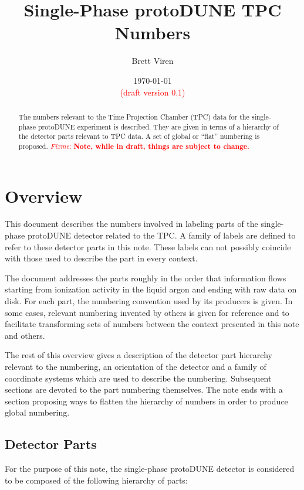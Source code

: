 \documentclass[pdftex,12pt,letter]{article}
\author{Brett Viren}
\date{\today \\ \textcolor{red}{(draft version 0.1)}}
\title{Single-Phase protoDUNE TPC Numbers}
\newcommand{\fixme}[1]{\textcolor{red}{\textit{Fixme}: \textbf{#1}}}
\begin{document}
\maketitle

\begin{abstract}
  The numbers relevant to the Time Projection Chamber (TPC) data for
  the single-phase protoDUNE experiment is described.  They are given
  in terms of a hierarchy of the detector parts relevant to TPC data.
  A set of global or ``flat'' numbering is proposed.  \fixme{Note,
    while in draft, things are subject to change.}
\end{abstract}

\tableofcontents
\newpage
\section{Overview}

This document describes the numbers involved in labeling parts of the
single-phase protoDUNE detector related to the TPC.  A family of
labels are defined to refer to these detector parts in this note.
These labels can not possibly coincide with those used to describe the
part in every context. 

The document addresses the parts roughly in the order that information
flows starting from ionization activity in the liquid argon and ending
with raw data on disk.  For each part, the numbering convention used
by its producers is given.  In some cases, relevant numbering invented
by others is given for reference and to facilitate transforming sets
of numbers between the context presented in this note and others.

The rest of this overview gives a description of the detector part
hierarchy relevant to the numbering, an orientation of the detector
and a family of coordinate systems which are used to describe the
numbering.  Subsequent sections are devoted to the part numbering
themselves.  The note ends with a section proposing ways to flatten
the hierarchy of numbers in order to produce global numbering.

\subsection{Detector Parts}
\label{sec:parts}

For the purpose of this note, the single-phase protoDUNE detector is
considered to be composed of the following hierarchy of parts:
\end{document}

